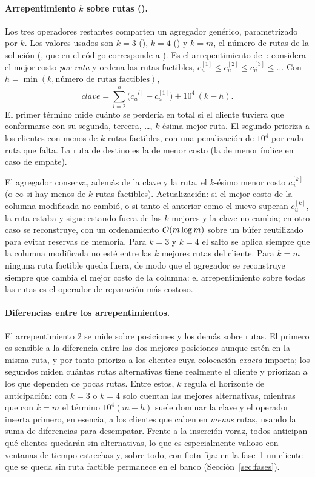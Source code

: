 \paragraph{Arrepentimiento $k$ sobre rutas ().} Los tres operadores
restantes comparten un agregador genérico, parametrizado por $k$. Los valores usados son
$k=3$ (), $k=4$ () y $k=m$, el número de rutas de
la solución (, que en el código corresponde a ). Es el
arrepentimiento de~\cite{ropke2006}: considera el mejor costo \emph{por ruta} y ordena las
rutas factibles, $c^{[1]}_u\le c^{[2]}_u\le c^{[3]}_u\le\dots$ Con
$h=\min(k,\text{número de rutas factibles})$,
\begin{equation}
\textit{clave}=\sum_{l=2}^{h}\bigl(c^{[l]}_u-c^{[1]}_u\bigr)+10^{4}\,(k-h).
\label{eq:regretk}
\end{equation}
El primer término mide cuánto se perdería en total si el cliente tuviera que conformarse con
su segunda, tercera, \dots, $k$-ésima mejor ruta. El segundo prioriza a los clientes con menos
de $k$ rutas factibles, con una penalización de $10^4$ por cada ruta que falta. La ruta de
destino es la de menor costo (la de menor índice en caso de empate).

El agregador conserva, además de la clave y la ruta, el $k$-ésimo menor costo $c^{[k]}_u$
(o $\infty$ si hay menos de $k$ rutas factibles). Actualización: si el mejor costo de la
columna modificada no cambió, o si tanto el anterior como el nuevo superan $c^{[k]}_u$, la
ruta estaba y sigue estando fuera de las $k$ mejores y la clave no cambia; en otro caso se
reconstruye, con un ordenamiento $\mathcal{O}(m\log m)$ sobre un búfer reutilizado para evitar
reservas de memoria. Para $k=3$ y $k=4$ el salto se aplica siempre que la columna modificada
no esté entre las $k$ mejores rutas del cliente. Para $k=m$ ninguna ruta factible queda fuera,
de modo que el agregador se reconstruye siempre que cambia el mejor costo de la columna: el
arrepentimiento sobre todas las rutas es el operador de reparación más costoso.

\paragraph{Diferencias entre los arrepentimientos.} El arrepentimiento 2 se mide sobre
posiciones y los demás sobre rutas. El primero es sensible a la diferencia entre las dos
mejores posiciones aunque estén en la misma ruta, y por tanto prioriza a los clientes cuya
colocación \emph{exacta} importa; los segundos miden cuántas rutas alternativas tiene
realmente el cliente y priorizan a los que dependen de pocas rutas. Entre estos, $k$ regula el
horizonte de anticipación: con $k=3$ o $k=4$ solo cuentan las mejores alternativas, mientras
que con $k=m$ el término $10^{4}(m-h)$ suele dominar la clave y el operador inserta primero,
en esencia, a los clientes que caben en \emph{menos} rutas, usando la suma de diferencias
para desempatar. Frente a la inserción voraz, todos anticipan qué clientes quedarán sin
alternativas, lo que es especialmente valioso con ventanas de tiempo estrechas y, sobre todo,
con flota fija: en la fase~1 un cliente que se queda sin ruta factible permanece en el banco
(Sección~\ref{sec:fases}).

